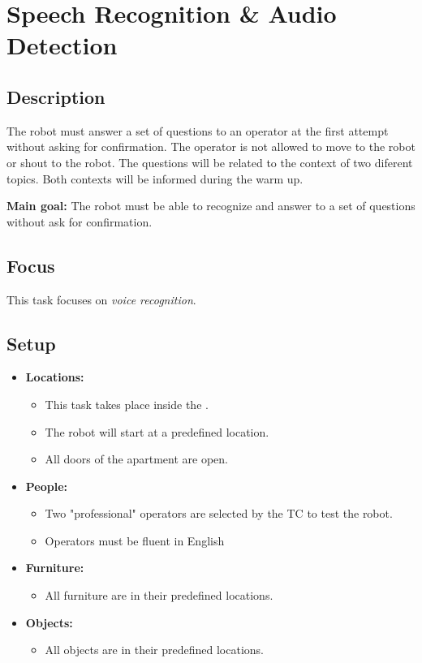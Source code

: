 \section{Speech Recognition \& Audio Detection}
\label{test:speech-recognition-audio-detection}

\subsection*{Description}
The robot must answer a set of questions to an operator at the first attempt without asking for confirmation. 
The operator is not allowed to move to the robot or shout to the robot. 
The questions will be related to the context of two diferent topics.
Both contexts will be informed during the warm up.

\noindent \textbf{Main goal:}
The robot must be able to recognize and answer to a set of questions without ask for confirmation.


\subsection*{Focus}
This task focuses on
\textit{voice recognition}.

\subsection*{Setup}
\begin{itemize}[nosep]	
	\item \textbf{Locations:} 
	\begin{itemize}
		\item This task takes place inside the \Arena{}.
		\item The robot will start at a predefined location.
		\item All doors of the apartment are open.
	\end{itemize}	 
	\item \textbf{People:} 
	\begin{itemize}
		\item Two "professional" operators are selected by the TC to test the robot.
		\item Operators must be fluent in English
	\end{itemize}
	\item \textbf{Furniture:} 
	\begin{itemize}
		\item All furniture are in their predefined locations.
	\end{itemize}
    \item \textbf{Objects:} 
    \begin{itemize}
		\item All objects are in their predefined locations.
	\end{itemize}
\end{itemize}

